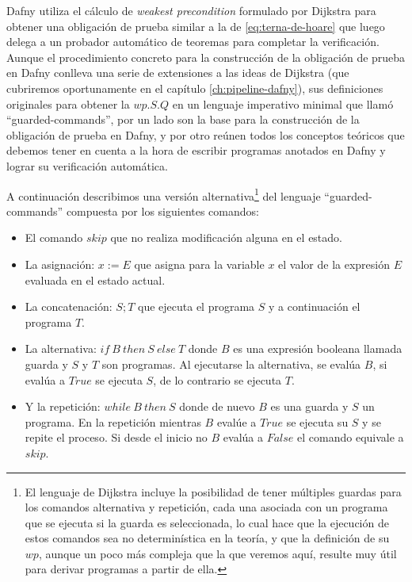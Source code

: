 \documentclass[12pt, a4paper, openany, fleqn]{book}
\begin{document}
    Dafny utiliza el cálculo de \textit{weakest precondition} formulado por Dijkstra para obtener una obligación de prueba similar a la de \ref{eq:terna-de-hoare} que luego delega a un probador automático de teoremas para completar la verificación.
    Aunque el procedimiento concreto para la construcción de la obligación de prueba en Dafny conlleva una serie de extensiones a las ideas de Dijkstra (que cubriremos oportunamente en el capítulo \ref{ch:pipeline-dafny}), sus definiciones originales para obtener la $wp.S.Q$ en un lenguaje imperativo minimal que llamó ``guarded-commands''\cite{EWD:EWD418}, por un lado son la base para la construcción de la obligación de prueba en Dafny, y por otro reúnen todos los conceptos teóricos que debemos tener en cuenta a la hora de escribir programas anotados en Dafny y lograr su verificación automática.

    A continuación describimos una versión alternativa\footnote{El lenguaje de Dijkstra incluye la posibilidad de tener múltiples guardas para los comandos alternativa y repetición, cada una asociada con un programa que se ejecuta si la guarda es seleccionada, lo cual hace que la ejecución de estos comandos sea no determinística en la teoría, y que la definición de su $wp$, aunque un poco más compleja que la que veremos aquí, resulte muy útil para derivar programas a partir de ella.} del lenguaje ``guarded-commands'' compuesta por los siguientes comandos:
    \begin{itemize}
        \item El comando $skip$ que no realiza modificación alguna en el estado.
        \item La asignación: $x := E$ que asigna para la variable $x$ el valor de la expresión $E$ evaluada en el estado actual.
        \item La concatenación: $S;T$ que ejecuta el programa $S$ y a continuación el programa $T$.
        \item La alternativa: $if\ B\ then\ S\ else\ T$ donde $B$ es una expresión booleana llamada guarda y $S$ y $T$ son programas. Al ejecutarse la alternativa, se evalúa $B$, si evalúa a $True$ se ejecuta $S$, de lo contrario se ejecuta $T$.
        \item Y la repetición: $while\ B\ then\ S$ donde de nuevo $B$ es una guarda y $S$ un programa. En la repetición mientras $B$ evalúe a $True$ se ejecuta su $S$ y se repite el proceso. Si desde el inicio no $B$ evalúa a $False$ el comando equivale a $skip$.
    \end{itemize}
\end{document}
